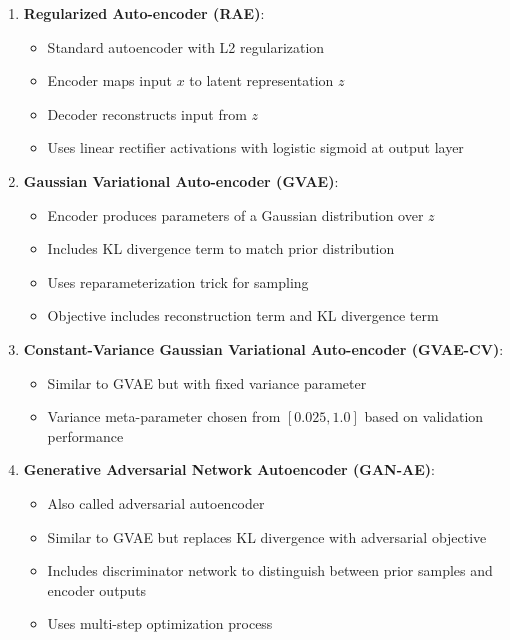 \documentclass{article}
\begin{document}
\begin{enumerate}
  \item \textbf{Regularized Auto-encoder (RAE)}:
  \begin{itemize}
    \item Standard autoencoder with L2 regularization
    \item Encoder maps input $x$ to latent representation $z$
    \item Decoder reconstructs input from $z$
    \item Uses linear rectifier activations with logistic sigmoid at output layer
  \end{itemize}

  \item \textbf{Gaussian Variational Auto-encoder (GVAE)}:
  \begin{itemize}
    \item Encoder produces parameters of a Gaussian distribution over $z$
    \item Includes KL divergence term to match prior distribution
    \item Uses reparameterization trick for sampling
    \item Objective includes reconstruction term and KL divergence term
  \end{itemize}

  \item \textbf{Constant-Variance Gaussian Variational Auto-encoder (GVAE-CV)}:
  \begin{itemize}
    \item Similar to GVAE but with fixed variance parameter
    \item Variance meta-parameter chosen from $[0.025, 1.0]$ based on validation performance
  \end{itemize}

  \item \textbf{Generative Adversarial Network Autoencoder (GAN-AE)}:
  \begin{itemize}
    \item Also called adversarial autoencoder
    \item Similar to GVAE but replaces KL divergence with adversarial objective
    \item Includes discriminator network to distinguish between prior samples and encoder outputs
    \item Uses multi-step optimization process
  \end{itemize}
\end{enumerate}
\end{document}
